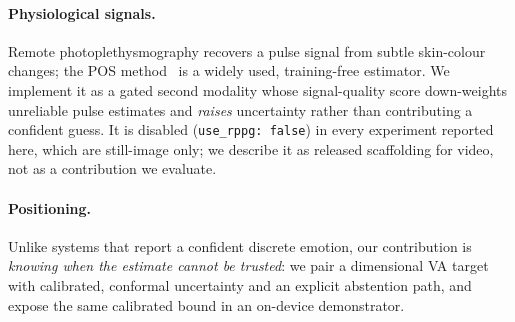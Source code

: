 \paragraph{Physiological signals.} Remote photoplethysmography recovers a pulse
signal from subtle skin-colour changes; the POS method~\cite{wang2017pos} is a
widely used, training-free estimator. We implement it as a gated second modality whose
signal-quality score down-weights unreliable pulse estimates and \emph{raises}
uncertainty rather than contributing a confident guess. It is disabled
(\texttt{use\_rppg: false}) in every experiment reported here, which are
still-image only; we describe it as released scaffolding for video, not as a
contribution we evaluate.

\paragraph{Positioning.} Unlike systems that report a confident discrete emotion,
our contribution is \emph{knowing when the estimate cannot be trusted}: we pair a
dimensional VA target with calibrated, conformal uncertainty and an explicit
abstention path, and expose the same calibrated bound in an on-device demonstrator.
